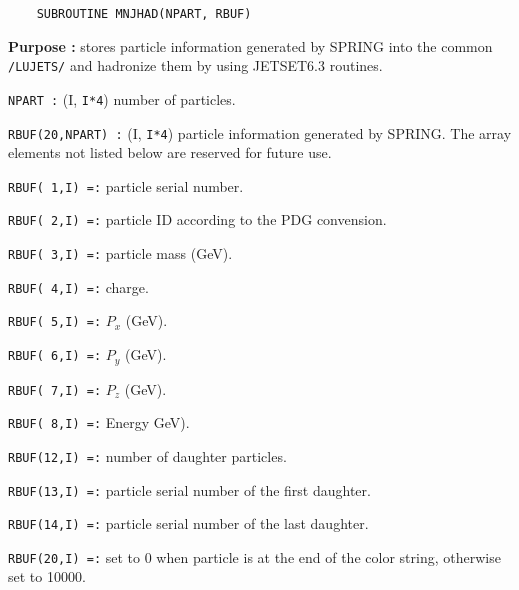 \newlength{\MNJHAD}
\settowidth{\MNJHAD}{\tt SUBROUTINE MNJHAD(NPART, RBUF)}
\begin{verbatim}
    SUBROUTINE MNJHAD(NPART, RBUF)
\end{verbatim}
\vspace{-28pt}
\hspace*{4ex}\fbox{\rule[14pt]{\MNJHAD}{0cm}}
\begin{list}{ }{\parsep=0pt \itemsep=0pt \topsep=0pt }
\item[\bf Purpose :] stores particle information generated by SPRING
into the common {\tt /LUJETS/} and hadronize them 
by using JETSET6.3 routines.
\item[\tt NPART :] (I, {\tt I*4}) number of particles.
\item[\tt RBUF(20,NPART) :] (I, {\tt I*4})
particle information generated by SPRING. The array elements not
listed below are reserved for future use.
  \begin{list}{ }{\parsep=0pt \itemsep=0pt \topsep=0pt }
  \item[\tt  RBUF( 1,I) =:] particle serial number.
  \item[\tt RBUF( 2,I) =:] particle ID according to the PDG convension\cite{PDG}.
  \item[\tt RBUF( 3,I) =:] particle mass (GeV).
  \item[\tt RBUF( 4,I) =:] charge.
  \item[\tt RBUF( 5,I) =:] $P_x$ (GeV).
  \item[\tt RBUF( 6,I) =:] $P_y$ (GeV).
  \item[\tt RBUF( 7,I) =:] $P_z$ (GeV).
  \item[\tt RBUF( 8,I) =:] Energy GeV).
  \item[\tt RBUF(12,I) =:] number of daughter particles.
  \item[\tt RBUF(13,I) =:] particle serial number of the first daughter.
  \item[\tt RBUF(14,I) =:] particle serial number of the last daughter.
  \item[\tt RBUF(20,I) =:] set to 0 when particle is at the end of the
color string, otherwise set to 10000.
  \end{list}
\end{list}

